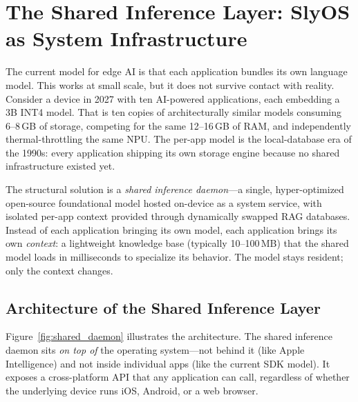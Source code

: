 \documentclass[12pt, letterpaper, twoside]{report}
\begin{document}
\section{The Shared Inference Layer: SlyOS as System Infrastructure}
\label{sec:shared_daemon}

The current model for edge AI is that each application bundles its own language model. This works at small scale, but it does not survive contact with reality. Consider a device in 2027 with ten AI-powered applications, each embedding a 3B INT4 model. That is ten copies of architecturally similar models consuming 6--8\,GB of storage, competing for the same 12--16\,GB of RAM, and independently thermal-throttling the same NPU. The per-app model is the local-database era of the 1990s: every application shipping its own storage engine because no shared infrastructure existed yet.

The structural solution is a \textit{shared inference daemon}---a single, hyper-optimized open-source foundational model hosted on-device as a system service, with isolated per-app context provided through dynamically swapped RAG databases. Instead of each application bringing its own model, each application brings its own \textit{context}: a lightweight knowledge base (typically 10--100\,MB) that the shared model loads in milliseconds to specialize its behavior. The model stays resident; only the context changes.

\subsection{Architecture of the Shared Inference Layer}

Figure~\ref{fig:shared_daemon} illustrates the architecture. The shared inference daemon sits \textit{on top of} the operating system---not behind it (like Apple Intelligence) and not inside individual apps (like the current SDK model). It exposes a cross-platform API that any application can call, regardless of whether the underlying device runs iOS, Android, or a web browser.
\end{document}
